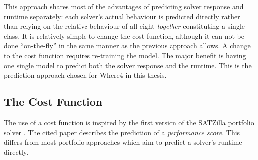 This approach shares most of the advantages of predicting solver response and runtime separately: each solver's actual behaviour is predicted directly rather than relying on the relative behaviour of all eight \textit{together} constituting a single class. 
It is relatively simple to change the cost function, although it can not be done ``on-the-fly'' in the same manner as the previous approach allows.
A change to the cost function requires re-training the model.
The major benefit is having one single model to predict both the solver response and the runtime. 
This is the prediction approach chosen for \textsf{Where4} in this thesis.  

\subsection{The Cost Function}
\label{sub:scoring}

The use of a cost function is inspired by the first version of the SATZilla portfolio solver \cite{Satzilla}. 
The cited paper describes the prediction of a \textit{performance score}.
This differs from most portfolio approaches which aim to predict a solver's runtime directly. 

